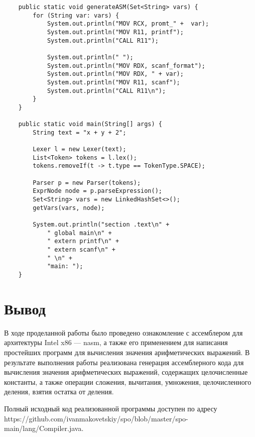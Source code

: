 \begin{Verbatim}
	public static void generateASM(Set<String> vars) {
		for (String var: vars) {
			System.out.println("MOV RCX, promt_" +  var);
			System.out.println("MOV R11, printf");
			System.out.println("CALL R11");

			System.out.println(" ");
			System.out.println("MOV RDX, scanf_format");
			System.out.println("MOV RDX, " + var);
			System.out.println("MOV R11, scanf");
			System.out.println("CALL R11\n");
		}
	}

	public static void main(String[] args) {
		String text = "x + y + 2";
		
		Lexer l = new Lexer(text);
		List<Token> tokens = l.lex();
		tokens.removeIf(t -> t.type == TokenType.SPACE);

		Parser p = new Parser(tokens);
		ExprNode node = p.parseExpression();
		Set<String> vars = new LinkedHashSet<>();
		getVars(vars, node);

		System.out.println("section .text\n" + 
			" global main\n" +
			" extern printf\n" + 
			" extern scanf\n" +
			" \n" +
			"main: ");
	}
\end{Verbatim}

\section{Вывод}

В ходе проделанной работы было проведено ознакомление с ассемблером для архитектуры Intel x86 — nasm, а также его применением для написания простейших программ для вычисления значения арифметических выражений. В результате выполнения работы реализована генерация ассемблерного кода для вычисления значения арифметических выражений, содержащих целочисленные константы, а также операции сложения, вычитания, умножения, целочисленного деления, взятия остатка от деления.

Полный исходный код реализованной программы доступен по адресу  \\ https://github.com/ivanmakovetskiy/spo/blob/master/spo-main/lang/Compiler.java.

